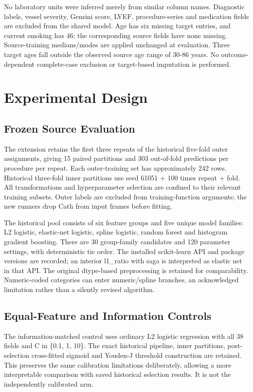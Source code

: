 \documentclass[conference]{IEEEtran}
\begin{document}
No laboratory units were inferred merely from similar column names. Diagnostic labels, vessel severity, Gensini score, LVEF, procedure-series and medication fields are excluded from the shared model. Age has six missing target entries, and current smoking has 46; the corresponding source fields have none missing. Source-training medians/modes are applied unchanged at evaluation. Three target ages fall outside the observed source age range of 30-86 years. No outcome-dependent complete-case exclusion or target-based imputation is performed.

\section{Experimental Design}
\subsection{Frozen Source Evaluation}
The extension retains the first three repeats of the historical five-fold outer assignments, giving 15 paired partitions and 303 out-of-fold predictions per procedure per repeat. Each outer-training set has approximately 242 rows. Historical three-fold inner partitions use seed 61051 + 100 times repeat + fold. All transformations and hyperparameter selection are confined to their relevant training subsets. Outer labels are excluded from training-function arguments; the new runners drop Cath from input frames before fitting.

The historical pool consists of six feature groups and five unique model families: L2 logistic, elastic-net logistic, spline logistic, random forest and histogram gradient boosting. There are 30 group-family candidates and 120 parameter settings, with deterministic tie order. The installed scikit-learn API and package versions are recorded; an interior l1\_ratio with saga is interpreted as elastic net in that API. The original dtype-based preprocessing is retained for comparability. Numeric-coded categories can enter numeric/spline branches, an acknowledged limitation rather than a silently revised algorithm.

\subsection{Equal-Feature and Information Controls}
The information-matched control uses ordinary L2 logistic regression with all 38 fields and C in \{0.1, 1, 10\}. The exact historical pipeline, inner partitions, post-selection cross-fitted sigmoid and Youden-J threshold construction are retained. This preserves the same calibration limitations deliberately, allowing a more interpretable comparison with saved historical selection results. It is not the independently calibrated arm.
\end{document}
